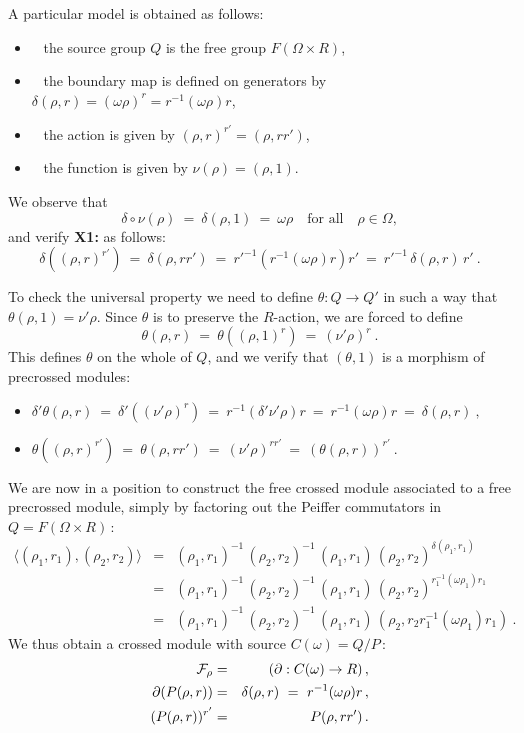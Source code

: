 \bigskip\noindent
A particular model is obtained as follows:
\begin{itemize}
\item~ the source group $Q$ is the free group $F(\Omega \times R)$,
\item~ the boundary map is defined on generators by 
$\delta(\rho,r) = (\omega\rho)^r = r^{-1}(\omega\rho)r$,
\item~ the action is given by $(\rho,r)^{r'} = (\rho,rr')$,
\item~ the function is given by $\nu(\rho) = (\rho,1)$.
\end{itemize}

\noindent
We observe that
$$
\delta\circ\nu(\rho) ~=~ \delta(\rho,1) ~=~ \omega\rho
\quad\text{for all}\quad  \rho \in \Omega,
$$
and verify {\bf X1:} as follows:
$$
\delta((\rho,r)^{r'}) ~=~
\delta(\rho,rr') ~=~
{r'}^{-1}(r^{-1}(\omega\rho)r)r' ~=~
{r'}^{-1}\,\delta(\rho,r)\,r'~.
$$

To check the universal property we need to define
$\theta : Q \to Q'$  in such a way that  $\theta(\rho,1) = \nu'\rho$.
Since $\theta$ is to preserve the $R$-action, we are forced to define
$$
\theta(\rho,r) ~=~ 
\theta((\rho,1)^r) ~=~
(\nu'\rho)^r 
~.
$$
This defines $\theta$ on the whole of $Q$, and we verify that $(\theta,1)$
is a morphism of precrossed modules:
\begin{itemize}
\item\quad
$
\delta'\theta(\rho,r) ~=~
\delta'((\nu'\rho)^r) ~=~
r^{-1}(\delta'\nu'\rho)r ~=~
r^{-1}(\omega\rho)r ~=~
\delta(\rho,r) ~,
$
\item\quad
$
\theta((\rho,r)^{r'}) ~=~
\theta(\rho,rr') ~=~
(\nu' \rho)^{rr'} ~=~
(\theta(\rho,r))^{r'} ~.
$
\end{itemize}

We are now in a position to construct the free crossed module
associated to a free precrossed module, simply by factoring out
the Peiffer commutators in  $Q = F(\Omega \times R)$\,:
\begin{eqnarray*}
\langle (\rho_1, r_1), (\rho_2, r_2) \rangle 
& = &
(\rho_1, r_1)^{-1}\,(\rho_2, r_2)^{-1}\,
  (\rho_1, r_1)\,(\rho_2, r_2)^{\delta(\rho_1, r_1)}  \\
& = &
(\rho_1, r_1)^{-1}\,(\rho_2, r_2)^{-1}\,
  (\rho_1, r_1)\,(\rho_2, r_2)^{r_1^{-1}(\omega\rho_1)r_1} \\
& = &
(\rho_1, r_1)^{-1}\,(\rho_2, r_2)^{-1}\,
  (\rho_1, r_1)\,(\rho_2, r_2r_1^{-1}(\omega\rho_1)r_1)~. 
\end{eqnarray*}
We thus obtain a crossed module with source  $C(\omega) = Q/P$\,:
\begin{eqnarray*}
\mathcal{F}_{\rho} & = & (\partial : C(\omega) \to R)\,, \\
\partial(P(\rho,r)) & = & \delta(\rho,r) ~=~ r^{-1}(\omega\rho)r\,, \\
(P(\rho,r))^{r'} & = & P(\rho,rr')\,.
\end{eqnarray*}

